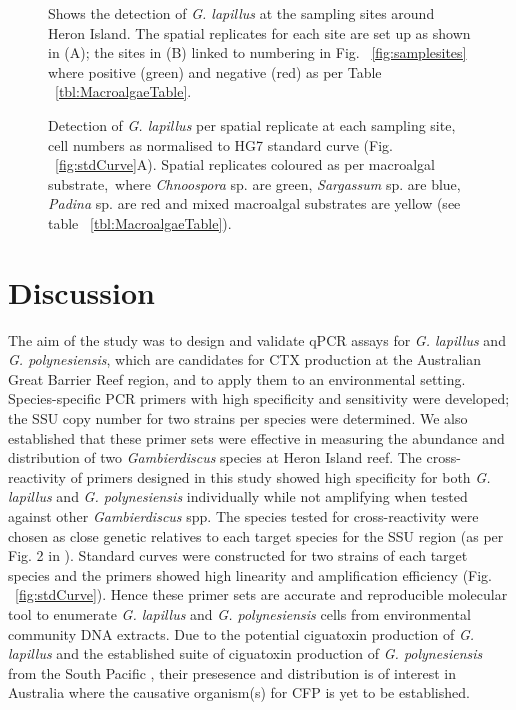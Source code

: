 \documentclass[12pt]{article}
\begin{document}
\FloatBarrier 
\begin{figure} 
\caption{Shows the detection of \emph{G. lapillus} at the sampling sites around Heron Island. The spatial replicates for each site are set up as shown in (A); the sites in (B) linked to numbering in Fig. ~\ref{fig:samplesites} where positive (green) and negative (red) as per Table ~\ref{tbl:MacroalgaeTable}.} 
\label{fig:envposneg}
\end{figure} 
\FloatBarrier

\FloatBarrier 
\begin{figure} 
\caption{Detection of \emph{G. lapillus} per spatial replicate at each sampling site, cell numbers as normalised to HG7 standard curve (Fig. ~\ref{fig:stdCurve}A). Spatial replicates coloured as per macroalgal substrate,\ where \emph{Chnoospora} sp. are green, \emph{Sargassum} sp. are blue, \emph{Padina} sp. are red and mixed macroalgal substrates are yellow (see table ~\ref{tbl:MacroalgaeTable}).} 
\label{fig:envHG7}
\end{figure} 
\FloatBarrier

\newpage
\section{Discussion}
The aim of the study was to design and validate qPCR assays for \emph{G. lapillus} and \emph{G. polynesiensis}, which are candidates for CTX production at the Australian Great Barrier Reef region, and to apply them to an environmental setting. 
Species-specific PCR primers with high specificity and sensitivity were developed; the SSU copy number for two strains per species were determined. We also established that these primer sets were effective in measuring the abundance and distribution of two \emph{Gambierdiscus} species at Heron Island reef. The cross-reactivity of primers designed in this study showed high specificity for both \emph{G. lapillus} and \emph{G. polynesiensis} individually while not amplifying when tested against other \emph{Gambierdiscus} spp. The species tested for cross-reactivity were chosen as close genetic relatives to each target species for the SSU region (as per Fig. 2 in \cite{kretzschmar2016characterization}).
Standard curves were constructed for two strains of each target species and the primers showed high linearity and amplification efficiency (Fig. ~\ref{fig:stdCurve}). Hence these primer sets are accurate and reproducible molecular tool to enumerate \emph{G. lapillus} and \emph{G. polynesiensis} cells from environmental community DNA extracts.
Due to the potential ciguatoxin production of \emph{G. lapillus} \cite{kretzschmar2016characterization} and the established suite of ciguatoxin production of \emph{G. polynesiensis} from the South Pacific \cite{chinain2010growth}, their presesence and distribution is of interest in Australia where the causative organism(s) for CFP is yet to be established.\\
\end{document}
